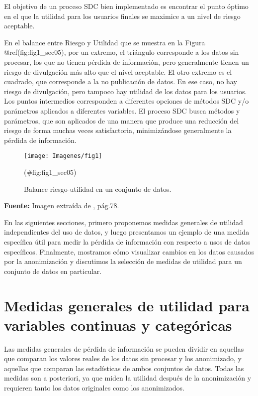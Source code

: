 \documentclass[
]{book}
\theoremstyle{definition}
\theoremstyle{definition}
\theoremstyle{definition}
\theoremstyle{definition}
\theoremstyle{remark}
\begin{document}
El objetivo de un proceso SDC bien implementado es encontrar el punto óptimo en el que la utilidad para los usuarios finales se maximice a un nivel de riesgo aceptable.

En el balance entre Riesgo y Utilidad que se muestra en la Figura @ref(fig:fig1\_sec05), por un extremo, el triángulo corresponde a los datos sin procesar, los que no tienen pérdida de información, pero generalmente tienen un riesgo de divulgación más alto que el nivel aceptable. El otro extremo es el cuadrado, que corresponde a la no publicación de datos. En ese caso, no hay riesgo de divulgación, pero tampoco hay utilidad de los datos para los usuarios. Los puntos intermedios corresponden a diferentes opciones de métodos SDC y/o parámetros aplicados a diferentes variables. El proceso SDC busca
métodos y parámetros, que son aplicados de una manera que produce una reducción del riesgo de forma muchas veces satisfactoria, minimizándose generalmente la pérdida de información.

\begin{figure}

{\centering \texttt{[image: Imagenes/fig1]} 

}

\caption{Balance riesgo-utilidad en un conjunto de datos.}(\#fig:fig1_sec05)
\end{figure}

\textbf{Fuente:} Imagen extraída de \citep{benschop2021}, pág.78.

En las siguientes secciones, primero proponemos medidas generales de utilidad independientes del uso de datos, y luego presentamos un ejemplo de una medida específica útil para medir la pérdida de información con respecto a usos de datos específicos. Finalmente, mostramos cómo visualizar cambios en los datos causados por la anonimización y discutimos la selección de medidas de utilidad para un conjunto de datos en particular.

\hypertarget{medidas-generales-de-utilidad-para-variables-continuas-y-categuxf3ricas}{%
\section{Medidas generales de utilidad para variables continuas y categóricas}\label{medidas-generales-de-utilidad-para-variables-continuas-y-categuxf3ricas}}

Las medidas generales de pérdida de información se pueden dividir en
aquellas que comparan los valores reales de los datos sin procesar y los
anonimizado, y aquellas que comparan las estadísticas de ambos conjuntos
de datos. Todas las medidas son a posteriori, ya que miden la utilidad
después de la anonimización y requieren tanto los datos originales como
los anonimizados.
\end{document}
